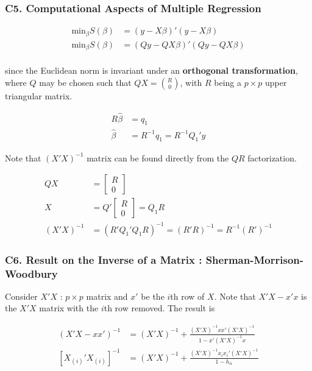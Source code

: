 \documentclass[12pt]{article}
\begin{document}
\subsubsection*{C5. Computational Aspects of Multiple Regression}


$$
\begin{aligned}
\mathrm{min}_\beta S(\beta) &= (y - X \beta)' (y - X \beta) \\[8pt]
\mathrm{min}_\beta S(\beta) &= (Qy - QX \beta)' (Qy -QX \beta) \\[8pt]
\end{aligned}
$$

since the Euclidean norm is invariant under an \textbf{orthogonal transformation}, where $Q$ may be chosen such that $QX = \binom{R}{0}$, with $R$ being a $p \times p$ upper triangular matrix.


$$
\begin{aligned}
R \hat{\beta} &= q_1 \\[8pt]
\hat{\beta} &= R^{-1} q_1 = R^{-1} Q_1' y
\end{aligned}
$$


Note that $(X'X)^{-1}$ matrix can be found directly from the $QR$ factorization. 


$$
\begin{aligned}
QX &= \begin{bmatrix} R \\ 0 \end{bmatrix} \\[8pt]
X  &= Q' \begin{bmatrix} R \\ 0 \end{bmatrix} = Q_1 R \\[8pt]
(X'X)^{-1} &= (R'Q_1'Q_1R)^{-1} = (R'R)^{-1} = R^{-1}(R')^{-1}
\end{aligned}
$$




\subsubsection*{C6. Result on the Inverse of a Matrix : Sherman-Morrison-Woodbury}

Consider $X'X$ : $p \times p$ matrix and $x'$ be the $i$th row of $X$. Note that $X'X - x'x$ is the $X'X$ matrix with the $i$th row removed. The result is

$$
\begin{aligned}
(X'X - xx')^{-1} &= (X'X)^{-1} + \frac{ (X'X)^{-1} xx' (X'X)^{-1} }{ 1-x'(X'X)^{-1}x } \\[10pt]
[X_{(i)}' X_{(i)}]^{-1} &= (X'X)^{-1} + \frac{ (X'X)^{-1}x_i x_i'(X'X)^{-1} }{ 1-h_{ii} }
\end{aligned}
$$
\end{document}
